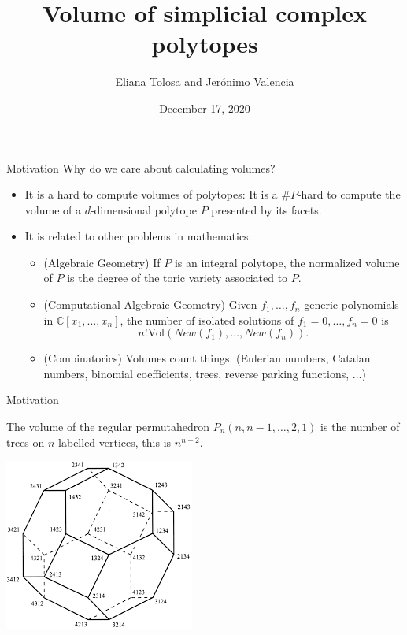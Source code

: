 \documentclass{beamer}
\title[Your Short Title]{Volume of simplicial complex polytopes}
\author{Eliana Tolosa and Jerónimo Valencia}
\institute{San Francisco State University and Universidad de los Andes}
\date{December 17, 2020}
\begin{document}
\begin{frame}
  \titlepage
\end{frame}


\begin{frame}{Motivation}
    Why do we care about calculating volumes?
    \begin{itemize}
    \item It is a hard to compute volumes of polytopes: It is a $\#P$-hard to compute the volume of a $d$-dimensional polytope $P$ presented by its facets.
    \pause
    \vspace{0.5cm}
    \item It is related to other problems in mathematics:
    \pause
        \begin{itemize}
            \item (Algebraic Geometry) If $P$ is an integral polytope, the normalized volume of $P$ is the degree of the toric variety associated to $P$.
            \pause
            \item (Computational Algebraic Geometry) Given $f_1,\dots, f_n$ generic polynomials in $\mathbb{C}[x_1,\dots,x_n]$, the number of isolated solutions of $f_1=0, \dots, f_n=0$ is $$n! \text{Vol}(New(f_1), \dots, New(f_n)).$$
            \pause
            \item (Combinatorics) Volumes count things. (Eulerian numbers, Catalan numbers, binomial coefficients, trees, reverse parking functions, $\dots$)
        \end{itemize}
    \end{itemize}
\end{frame}


\begin{frame}{Motivation}
\begin{theorem}
The volume of the regular permutahedron $P_n(n,n-1,\dots, 2,1)$ is the number of trees on $n$ labelled vertices, this is $n^{n-2}$.
\vspace{0.6cm}
\end{theorem}
\begin{center}
    \includegraphics[scale=0.5]{images/Unknown.png}
\end{center}

\end{frame}
\end{document}
